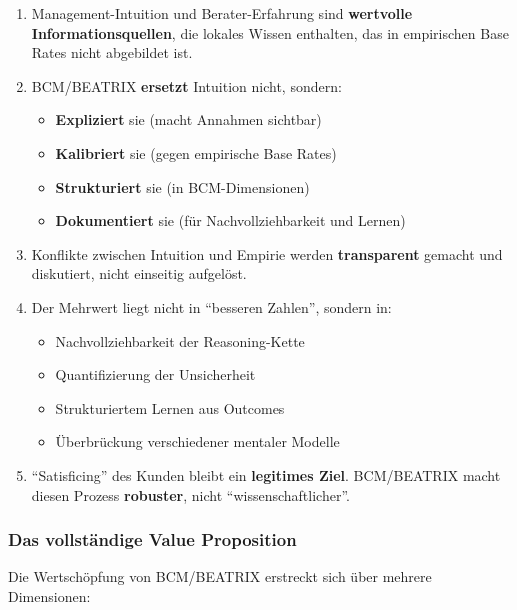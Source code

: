 \begin{axiom}
\begin{enumerate}
    \item Management-Intuition und Berater-Erfahrung sind \textbf{wertvolle Informationsquellen}, die lokales Wissen enthalten, das in empirischen Base Rates nicht abgebildet ist.

    \item BCM/BEATRIX \textbf{ersetzt} Intuition nicht, sondern:
    \begin{itemize}
        \item \textbf{Expliziert} sie (macht Annahmen sichtbar)
        \item \textbf{Kalibriert} sie (gegen empirische Base Rates)
        \item \textbf{Strukturiert} sie (in BCM-Dimensionen)
        \item \textbf{Dokumentiert} sie (für Nachvollziehbarkeit und Lernen)
    \end{itemize}

    \item Konflikte zwischen Intuition und Empirie werden \textbf{transparent} gemacht und diskutiert, nicht einseitig aufgelöst.

    \item Der Mehrwert liegt nicht in ``besseren Zahlen'', sondern in:
    \begin{itemize}
        \item Nachvollziehbarkeit der Reasoning-Kette
        \item Quantifizierung der Unsicherheit
        \item Strukturiertem Lernen aus Outcomes
        \item Überbrückung verschiedener mentaler Modelle
    \end{itemize}

    \item ``Satisficing'' des Kunden bleibt ein \textbf{legitimes Ziel}. BCM/BEATRIX macht diesen Prozess \textbf{robuster}, nicht ``wissenschaftlicher''.
\end{enumerate}
\end{axiom}

\subsubsection{Das vollständige Value Proposition}

Die Wertschöpfung von BCM/BEATRIX erstreckt sich über mehrere Dimensionen:

